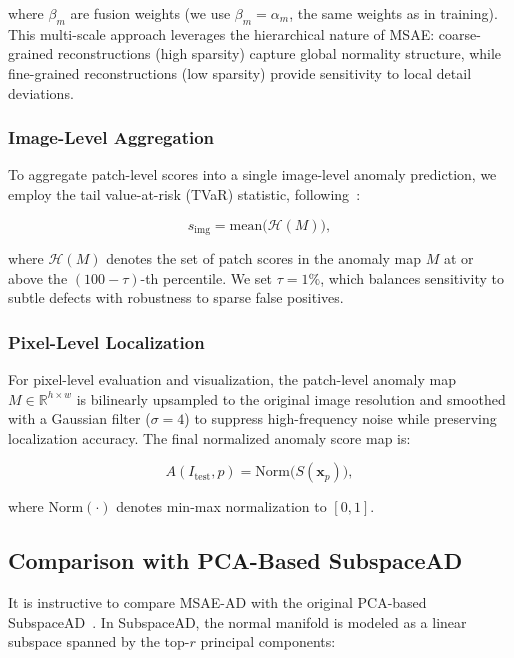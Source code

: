 where $\beta_m$ are fusion weights (we use $\beta_m = \alpha_m$, the same weights as in training).
This multi-scale approach leverages the hierarchical nature of MSAE: coarse-grained reconstructions (high sparsity) capture global normality structure, while fine-grained reconstructions (low sparsity) provide sensitivity to local detail deviations.

\subsubsection{Image-Level Aggregation}

To aggregate patch-level scores into a single image-level anomaly prediction, we employ the tail value-at-risk (TVaR) statistic, following~\cite{Lendering2025SubspaceAD,Deng2024AnomalyDINO}:

\begin{equation}
    s_{\text{img}} = \text{mean}\big(\mathcal{H}(M)\big),
    \label{eq:tvar}
\end{equation}

where $\mathcal{H}(M)$ denotes the set of patch scores in the anomaly map $M$ at or above the $(100 - \tau)$-th percentile.
We set $\tau = 1\%$, which balances sensitivity to subtle defects with robustness to sparse false positives.

\subsubsection{Pixel-Level Localization}

For pixel-level evaluation and visualization, the patch-level anomaly map $M \in \mathbb{R}^{h \times w}$ is bilinearly upsampled to the original image resolution and smoothed with a Gaussian filter ($\sigma = 4$) to suppress high-frequency noise while preserving localization accuracy.
The final normalized anomaly score map is:

\begin{equation}
    A(I_{\text{test}}, p) = \text{Norm}\big(S(\mathbf{x}_p)\big),
    \label{eq:norm_score}
\end{equation}

where $\text{Norm}(\cdot)$ denotes min-max normalization to $[0, 1]$.

\subsection{Comparison with PCA-Based SubspaceAD}

It is instructive to compare MSAE-AD with the original PCA-based SubspaceAD~\cite{Lendering2025SubspaceAD}.
In SubspaceAD, the normal manifold is modeled as a linear subspace spanned by the top-$r$ principal components:

